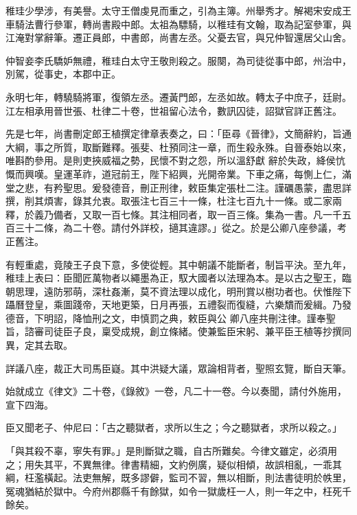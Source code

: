 \begin{pinyinscope}
 稚珪少學涉，有美譽。太守王僧虔見而重之，引為主簿。州舉秀才。解褐宋安成王車騎法曹行參軍，轉尚書殿中郎。太祖為驃騎，以稚珪有文翰，取為記室參軍，與江淹對掌辭筆。遷正員郎，中書郎，尚書左丞。父憂去官，與兄仲智還居父山舍。



 仲智妾李氏驕妒無禮，稚珪白太守王敬則殺之。服闋，為司徒從事中郎，州治中，別駕，從事史，本郡中正。



 永明七年，轉驍騎將軍，復領左丞。遷黃門郎，左丞如故。轉太子中庶子，廷尉。江左相承用晉世張、杜律二十卷，世祖留心法令，數訊囚徒，詔獄官詳正舊注。



 先是七年，尚書刪定郎王植撰定律章表奏之，曰：「臣尋《晉律》，文簡辭約，旨通大綱，事之所質，取斷難釋。張斐、杜預同注一章，而生殺永殊。自晉泰始以來，唯斟酌參用。是則吏挾威福之勢，民懷不對之怨，所以溫舒獻
 辭於失政，絳侯忼慨而興嘆。皇運革祚，道冠前王，陛下紹興，光開帝業。下車之痛，每惻上仁，滿堂之悲，有矜聖思。爰發德音，刪正刑律，敕臣集定張杜二注。謹礪愚蒙，盡思詳撰，削其煩害，錄其允衷。取張注七百三十一條，杜注七百九十一條。或二家兩釋，於義乃備者，又取一百七條。其注相同者，取一百三條。集為一書。凡一千五百三十二條，為二十卷。請付外詳校，擿其違謬。」從之。於是公卿八座參議，考正舊注。



 有輕重處，竟陵王子良下意，多使從輕。其中朝議不能斷者，制旨平決。至九年，稚珪上表曰：臣聞匠萬物者以繩墨為正，馭大國者以法理為本。是以古之聖王，臨朝思理，遠防邪萌，深杜姦漸，莫不資法理以成化，明刑賞以樹功者也。伏惟陛下躡曆登皇，乘圖踐帝，天地更築，日月再張，五禮裂而復縫，六樂穨而爰緝。乃發德音，下明詔，降恤刑之文，申慎罰之典，敕臣與公
 卿八座共刪注律。謹奉聖旨，諮審司徒臣子良，稟受成規，創立條緒。使兼監臣宋躬、兼平臣王植等抄撰同異，定其去取。



 詳議八座，裁正大司馬臣嶷。其中洪疑大議，眾論相背者，聖照玄覽，斷自天筆。



 始就成立《律文》二十卷，《錄敘》一卷，凡二十一卷。今以奏聞，請付外施用，宣下四海。



 臣又聞老子、仲尼曰：「古之聽獄者，求所以生之；今之聽獄者，求所以殺之。」



 「與其殺不辜，寧失有罪。」是則斷獄之職，自古所難矣。今律文雖定，必須用之；用失其平，不異無律。律書精細，文約例廣，疑似相傾，故誤相亂，一乖其綱，枉濫橫起。法吏無解，既多謬僻，監司不習，無以相斷，則法書徒明於帙里，冤魂猶結於獄中。今府州郡縣千有餘獄，如令一獄歲枉一人，則一年之中，枉死千餘矣。




\end{pinyinscope}
